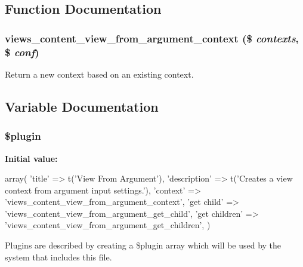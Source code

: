 \subsection{Function Documentation}
\hypertarget{view__from__argument_8inc_af6e24ab3dba62e478692b5381dbfcafd}{
\subsubsection[{views\_\-content\_\-view\_\-from\_\-argument\_\-context}]{\setlength{\rightskip}{0pt plus 5cm}views\_\-content\_\-view\_\-from\_\-argument\_\-context (\$ {\em contexts}, \/  \$ {\em conf})}}
\label{view__from__argument_8inc_af6e24ab3dba62e478692b5381dbfcafd}
Return a new context based on an existing context. 

\subsection{Variable Documentation}
\hypertarget{view__from__argument_8inc_ada8a7130088351710bb02ed622d6bf65}{
\subsubsection[{\$plugin}]{\setlength{\rightskip}{0pt plus 5cm}\$plugin}}
\label{view__from__argument_8inc_ada8a7130088351710bb02ed622d6bf65}
{\bfseries Initial value:}
\begin{DoxyCode}
 array(
  'title' => t('View From Argument'),
  'description' => t('Creates a view context from argument input settings.'),
  'context' => 'views_content_view_from_argument_context',
  'get child' => 'views_content_view_from_argument_get_child',
  'get children' => 'views_content_view_from_argument_get_children',
)
\end{DoxyCode}
Plugins are described by creating a \$plugin array which will be used by the system that includes this file. 